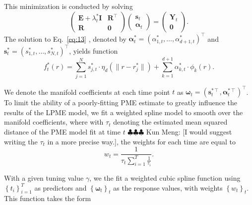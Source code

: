 \documentclass[11pt,reqno]{article}
\newcommand{\T}{\intercal}
\newcommand{\meng}[1]{{\color{purple} \sf $\clubsuit\clubsuit\clubsuit$ Kun Meng: [#1]}}
\theoremstyle{definition}
\begin{document}
This minimization is conducted by solving
\begin{equation}
  \left(
    \begin{array}{cc}
      \boldsymbol{E} + \lambda_t^* \boldsymbol{I} & \boldsymbol{R}^\T \\
      \boldsymbol{R} & \boldsymbol{0}
    \end{array}
  \right)\left(
    \begin{array}{c}
      \boldsymbol{s}_t \\
      \boldsymbol{\alpha}_t
    \end{array}
  \right) = \left(
    \begin{array}{c}
      \boldsymbol{Y}_t \\
      \boldsymbol{0}
    \end{array}
  \right). \label{eq:13}
\end{equation}
The solution to Eq.~\eqref{eq:13} , denoted by $\boldsymbol{\alpha}^*_t=(\alpha^*_{1,t},\ldots,\alpha^*_{d+1,t})^\T$ and $\boldsymbol{s}^*_t=(s^*_{1,t},\ldots,s^*_{N,t})^\T$, yields function
\begin{equation}
  f_t^*(r) = \sum_{j=1}^{N}s_{j,t}^* \cdot  \eta_{d}\left(\|r - r_j^*\|\right) + \sum_{k=1}^{d + 1}\alpha_{k,t}^* \cdot \phi_k(r). \label{eq:14}
\end{equation}

We denote the manifold coefficients at each time point $t$ as $\boldsymbol{\omega}_t = (\boldsymbol{s}_t^{*\T}, \boldsymbol{\alpha}_t^{*\T})^\T$. To limit the ability of a poorly-fitting PME estimate to greatly influence the results of the LPME model, we fit a weighted spline model to smooth over the manifold coefficients, where with $\tau_t$ denoting the estimated mean squared distance of the PME model fit at time $t$ \meng{I would suggest writing the $\tau_t$ in a more precise way.}, the weights for each time are equal to 
$$w_t = \frac{1}{\tau_t\sum_{i=1}^{T}\frac{1}{\tau_i}}.$$ 

With a given tuning value $\gamma$, we the fit a weighted cubic spline function using $\left\{t_i\right\}_{i=1}^T$ as predictors and $\left\{\mathbf{\omega}_t\right\}_t$ as the response values, with weights $\left\{w_t\right\}_t$. This function takes the form
\end{document}
